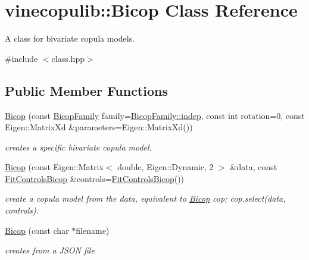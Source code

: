 \hypertarget{classvinecopulib_1_1_bicop}{}\section{vinecopulib\+:\+:Bicop Class Reference}
\label{classvinecopulib_1_1_bicop}


A class for bivariate copula models.  




{\ttfamily \#include $<$class.\+hpp$>$}

\subsection*{Public Member Functions}
\begin{DoxyCompactItemize}
\item 
\hyperlink{classvinecopulib_1_1_bicop_ad9b900b5d0ad9ba3d4a95a114b322291}{Bicop} (const \hyperlink{namespacevinecopulib_a42e95cc06d33896199caab0c11ad44f3}{Bicop\+Family} family=\hyperlink{namespacevinecopulib_a42e95cc06d33896199caab0c11ad44f3af49b022096e968010a7b9bd941805a65}{Bicop\+Family\+::indep}, const int rotation=0, const Eigen\+::\+Matrix\+Xd \&parameters=Eigen\+::\+Matrix\+Xd())
\begin{DoxyCompactList}\small\item\em creates a specific bivariate copula model. \end{DoxyCompactList}\item 
\hyperlink{classvinecopulib_1_1_bicop_ac439ded27a50239db5f94b4d8b1d7641}{Bicop} (const Eigen\+::\+Matrix$<$ double, Eigen\+::\+Dynamic, 2 $>$ \&data, const \hyperlink{classvinecopulib_1_1_fit_controls_bicop}{Fit\+Controls\+Bicop} \&controls=\hyperlink{classvinecopulib_1_1_fit_controls_bicop}{Fit\+Controls\+Bicop}())
\begin{DoxyCompactList}\small\item\em create a copula model from the data, equivalent to {\ttfamily \hyperlink{classvinecopulib_1_1_bicop}{Bicop} cop; cop.\+select(data, controls)}. \end{DoxyCompactList}\item 
\hyperlink{classvinecopulib_1_1_bicop_aebe3a41e3f23817f0234fa789c443a98}{Bicop} (const char $\ast$filename)
\begin{DoxyCompactList}\small\item\em creates from a J\+S\+ON file \end{DoxyCompactList}\item 

\end{DoxyCompactItemize}
